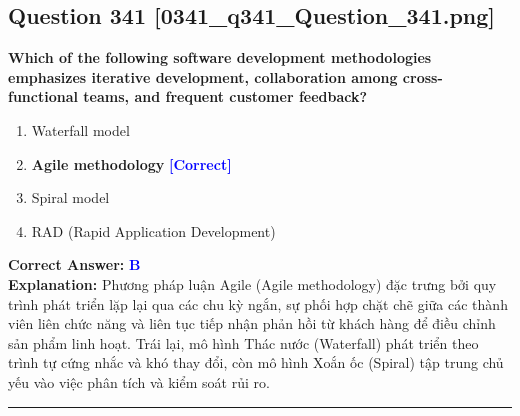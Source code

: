\documentclass[11pt,a4paper]{article}
\begin{document}
\begin{minipage}{\textwidth}
\subsection*{Question 341 \quad \footnotesize{[0341\_q341\_Question\_341.png]}}
\noindent \textbf{Which of the following software development methodologies emphasizes iterative development, collaboration among cross-functional teams, and frequent customer feedback?}

\begin{enumerate}[label=\Alph*.]
    \item Waterfall model
    \item \textbf{Agile methodology} \hfill \textcolor{blue}{\textbf{[Correct]}}
    \item Spiral model
    \item RAD (Rapid Application Development)
\end{enumerate}

\noindent \textbf{Correct Answer:} \textcolor{blue}{\textbf{B}} \\[2pt]
\noindent \textbf{Explanation:} Phương pháp luận Agile (Agile methodology) đặc trưng bởi quy trình phát triển lặp lại qua các chu kỳ ngắn, sự phối hợp chặt chẽ giữa các thành viên liên chức năng và liên tục tiếp nhận phản hồi từ khách hàng để điều chỉnh sản phẩm linh hoạt. Trái lại, mô hình Thác nước (Waterfall) phát triển theo trình tự cứng nhắc và khó thay đổi, còn mô hình Xoắn ốc (Spiral) tập trung chủ yếu vào việc phân tích và kiểm soát rủi ro.

\par\vspace{0.3cm}
\hrule
\vspace{0.3cm}
\end{minipage}
\end{document}
